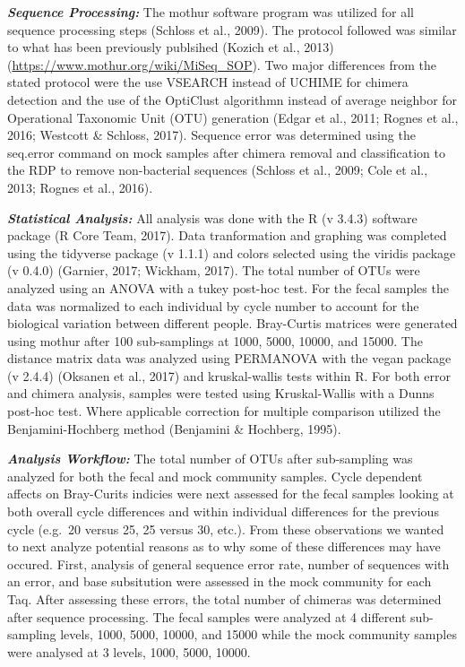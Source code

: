 \documentclass[12pt,]{article}
\begin{document}
\textbf{\emph{Sequence Processing:}} The mothur software program was
utilized for all sequence processing steps (Schloss et al., 2009). The
protocol followed was similar to what has been previously publsihed
(Kozich et al., 2013) (\url{https://www.mothur.org/wiki/MiSeq_SOP}). Two
major differences from the stated protocol were the use VSEARCH instead
of UCHIME for chimera detection and the use of the OptiClust algorithmn
instead of average neighbor for Operational Taxonomic Unit (OTU)
generation (Edgar et al., 2011; Rognes et al., 2016; Westcott \&
Schloss, 2017). Sequence error was determined using the seq.error
command on mock samples after chimera removal and classification to the
RDP to remove non-bacterial sequences (Schloss et al., 2009; Cole et
al., 2013; Rognes et al., 2016).

\textbf{\emph{Statistical Analysis:}} All analysis was done with the R
(v 3.4.3) software package (R Core Team, 2017). Data tranformation and
graphing was completed using the tidyverse package (v 1.1.1) and colors
selected using the viridis package (v 0.4.0) (Garnier, 2017; Wickham,
2017). The total number of OTUs were analyzed using an ANOVA with a
tukey post-hoc test. For the fecal samples the data was normalized to
each individual by cycle number to account for the biological variation
between different people. Bray-Curtis matrices were generated using
mothur after 100 sub-samplings at 1000, 5000, 10000, and 15000. The
distance matrix data was analyzed using PERMANOVA with the vegan package
(v 2.4.4) (Oksanen et al., 2017) and kruskal-wallis tests within R. For
both error and chimera analysis, samples were tested using
Kruskal-Wallis with a Dunns post-hoc test. Where applicable correction
for multiple comparison utilized the Benjamini-Hochberg method
(Benjamini \& Hochberg, 1995).

\textbf{\emph{Analysis Workflow:}} The total number of OTUs after
sub-sampling was analyzed for both the fecal and mock community samples.
Cycle dependent affects on Bray-Curits indicies were next assessed for
the fecal samples looking at both overall cycle differences and within
individual differences for the previous cycle (e.g.~20 versus 25, 25
versus 30, etc.). From these observations we wanted to next analyze
potential reasons as to why some of these differences may have occured.
First, analysis of general sequence error rate, number of sequences with
an error, and base subsitution were assessed in the mock community for
each Taq. After assessing these errors, the total number of chimeras was
determined after sequence processing. The fecal samples were analyzed at
4 different sub-sampling levels, 1000, 5000, 10000, and 15000 while the
mock community samples were analysed at 3 levels, 1000, 5000, 10000.
\end{document}
